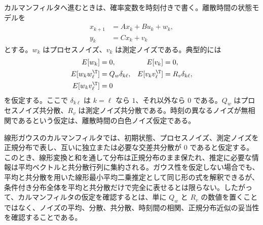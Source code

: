 カルマンフィルタへ進むときは、確率変数を時刻付きで書く。離散時間の状態モデルを
\begin{align}
  x_{k+1}&=Ax_k+Bu_k+w_k,\\
  y_k&=Cx_k+v_k
\end{align}
とする。$w_k$ はプロセスノイズ、$v_k$ は測定ノイズである。典型的には
\begin{align}
  E[w_k]&=0,&
  E[v_k]&=0,\\
  E[w_k w_\ell^\T]&=Q_w\delta_{k\ell},&
  E[v_k v_\ell^\T]&=R_v\delta_{k\ell},\\
  E[w_k v_\ell^\T]&=0
\end{align}
を仮定する。ここで $\delta_{k\ell}$ は $k=\ell$ なら $1$、それ以外なら $0$ である。$Q_w$ はプロセスノイズ共分散、$R_v$ は測定ノイズ共分散である。時刻の異なるノイズが無相関であるという仮定は、離散時間の白色ノイズ仮定である。

線形ガウスのカルマンフィルタでは、初期状態、プロセスノイズ、測定ノイズを正規分布で表し、互いに独立または必要な交差共分散が 0 であると仮定する。このとき、線形変換と和を通して分布は正規分布のまま保たれ、推定に必要な情報は平均ベクトルと共分散行列に集約される。ガウス性を仮定しない場合でも、平均と共分散を用いた線形最小平均二乗推定として同じ形の式を解釈できるが、条件付き分布全体を平均と共分散だけで完全に表せるとは限らない。したがって、カルマンフィルタの仮定を確認するとは、単に $Q_w$ と $R_v$ の数値を置くことではなく、ノイズの平均、分散、共分散、時刻間の相関、正規分布近似の妥当性を確認することである。
